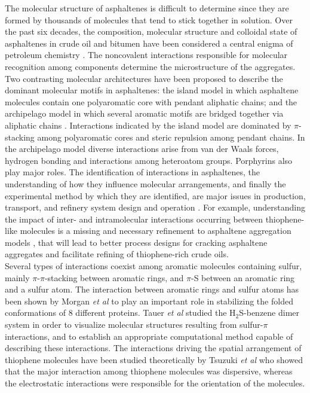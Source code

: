 	The molecular structure of asphaltenes is difficult to determine since they are formed by thousands of molecules that tend to stick together in solution. Over the past six decades, the composition, molecular structure and colloidal state of asphaltenes in crude oil and bitumen have been considered a central enigma of petroleum chemistry \cite{speight2014chemistry}. The noncovalent interactions responsible for molecular recognition among components determine the microstructure of the aggregates. Two contrasting molecular architectures have been proposed to describe the dominant molecular motifs in asphaltenes: the island model in which asphaltene molecules contain one polyaromatic core with pendant aliphatic chains; and the archipelago model in which several aromatic motifs are bridged together via aliphatic chains \cite{mullins2012advances,sheremata2004quantitative}. Interactions indicated by the island model are dominated by $\pi$-stacking among polyaromatic cores and steric repulsion among pendant chains. In the archipelago model diverse interactions arise from van der Waals forces, hydrogen bonding and interactions among heteroatom groups. Porphyrins also play major roles. The identification of interactions in asphaltenes, the understanding of how they influence molecular arrangements, and finally the experimental method by which they are identified, are major issues in production, transport, and refinery system design and operation \cite{speight1999desulfurization}. For example, understanding the impact of inter- and intramolecular interactions occurring between thiophene-like molecules is a missing and necessary refinement to asphaltene aggregation models \cite{groenzin1999asphaltene,mackie2010importance,mullins2012advances}, that will lead to better process designs for cracking asphaltene aggregates and facilitate refining of thiophene-rich crude oils.\\
	
	Several types of interactions coexist among aromatic molecules containing sulfur, mainly $\pi$-$\pi$-stacking between aromatic rings, and $\pi$-S between an aromatic ring and a sulfur atom. The interaction between aromatic rings and sulfur atoms has been shown by Morgan \textit{et al}\cite{morgan1978chains}  to play an important role in stabilizing the folded conformations of 8 different proteins. Tauer \textit{et al} \cite{tauer2005estimates} studied the H$_{2}$S-benzene dimer system in order to visualize molecular structures resulting from sulfur-$\pi$ interactions, and to establish an appropriate computational method capable of describing these interactions. The interactions driving the spatial arrangement of thiophene molecules have been studied theoretically by Tsuzuki \textit{et al} \cite{tsuzuki2002model} who showed that the major interaction among thiophene molecules was dispersive, whereas the electrostatic interactions were responsible for the orientation of the molecules.\\
	
